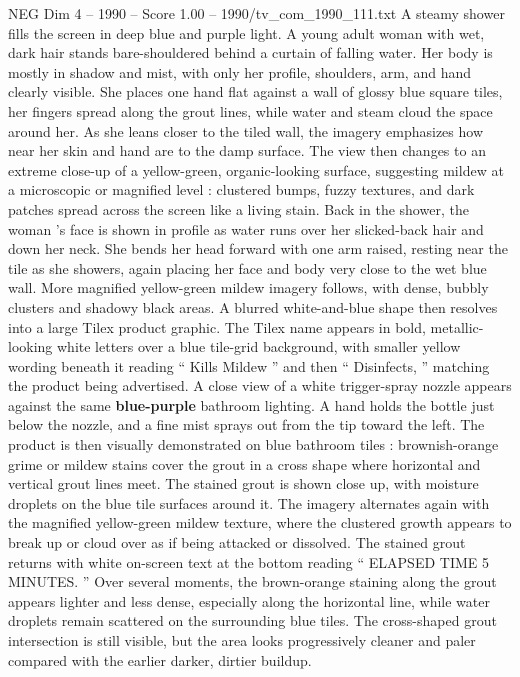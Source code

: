 \begin{textsample}{NEG Dim 4 – 1990 – Score 1.00 – 1990/tv\_com\_1990\_111.txt}  \label{ex:f4_neg_028}
A steamy shower fills the screen in deep blue and purple light.
A young adult woman with wet, dark hair stands bare-shouldered behind a curtain of falling water.
Her body is mostly in shadow and mist, with only her profile, shoulders, arm, and hand clearly visible.
She places one hand flat against a wall of glossy blue square tiles, her fingers spread along the grout lines, while water and steam cloud the space around her.
As she leans closer to the tiled wall, the imagery emphasizes how near her skin and hand are to the damp surface.
The view then changes to an extreme close-up of a yellow-green, organic-looking surface, suggesting mildew at a microscopic or magnified level : clustered bumps, fuzzy textures, and dark patches spread across the screen like a living stain.
Back in the shower, the woman ’s face is shown in profile as water runs over her slicked-back hair and down her neck.
She bends her head forward with one arm raised, resting near the tile as she showers, again placing her face and body very close to the wet blue wall.
More magnified yellow-green mildew imagery follows, with dense, bubbly clusters and shadowy black areas.
A blurred white-and-blue shape then resolves into a large Tilex product graphic.
The Tilex name appears in bold, metallic-looking white letters over a blue tile-grid background, with smaller yellow wording beneath it reading “ Kills Mildew ” and then “ Disinfects, ” matching the product being advertised.
A close view of a white trigger-spray nozzle appears against the same \textbf{blue-purple} bathroom lighting.
A hand holds the bottle just below the nozzle, and a fine mist sprays out from the tip toward the left.
The product is then visually demonstrated on blue bathroom tiles : brownish-orange grime or mildew stains cover the grout in a cross shape where horizontal and vertical grout lines meet.
The stained grout is shown close up, with moisture droplets on the blue tile surfaces around it.
The imagery alternates again with the magnified yellow-green mildew texture, where the clustered growth appears to break up or cloud over as if being attacked or dissolved.
The stained grout returns with white on-screen text at the bottom reading “ ELAPSED TIME 5 MINUTES. ” Over several moments, the brown-orange staining along the grout appears lighter and less dense, especially along the horizontal line, while water droplets remain scattered on the surrounding blue tiles.
The cross-shaped grout intersection is still visible, but the area looks progressively cleaner and paler compared with the earlier darker, dirtier buildup.

\end{textsample}
